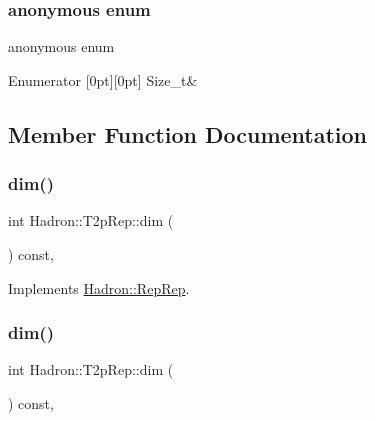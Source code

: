 \subsubsection{\texorpdfstring{anonymous enum}{anonymous enum}}
{\footnotesize\ttfamily anonymous enum}

\begin{DoxyEnumFields}{Enumerator}
[0pt][0pt]{}\mbox{\label{structHadron_1_1T2pRep_a7989805b15d30533a9f09771889773f2aa4ac0c05edb5f11de85bd33c675ea98c}} 
Size\+\_\+t&\\
\hline

\end{DoxyEnumFields}


\subsection{Member Function Documentation}
\mbox{\label{structHadron_1_1T2pRep_a7ececbae074c65b493f3bf73cf32c393}} 
\subsubsection{\texorpdfstring{dim()}{dim()}\hspace{0.1cm}{\footnotesize\ttfamily [1/5]}}
{\footnotesize\ttfamily int Hadron\+::\+T2p\+Rep\+::dim (\begin{DoxyParamCaption}{ }\end{DoxyParamCaption}) const\hspace{0.3cm}{\ttfamily [inline]}, {\ttfamily [virtual]}}



Implements \mbox{\hyperlink{structHadron_1_1RepRep_a92c8802e5ed7afd7da43ccfd5b7cd92b}{Hadron\+::\+Rep\+Rep}}.

\mbox{\label{structHadron_1_1T2pRep_a7ececbae074c65b493f3bf73cf32c393}} 
\subsubsection{\texorpdfstring{dim()}{dim()}\hspace{0.1cm}{\footnotesize\ttfamily [2/5]}}
{\footnotesize\ttfamily int Hadron\+::\+T2p\+Rep\+::dim (\begin{DoxyParamCaption}{ }\end{DoxyParamCaption}) const\hspace{0.3cm}{\ttfamily [inline]}, {\ttfamily [virtual]}}



